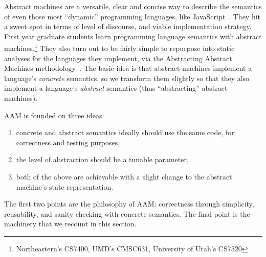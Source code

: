 Abstract machines are a versatile, clear and concise way to describe the semantics of even those most ``dynamic'' programming languages, like JavaScript~\citep{ianjohnson:DBLP:journals/corr/KashyapDKWGSWH14}.
%
They hit a sweet spot in terms of level of discourse, and viable implementation strategy.
%
First year graduate students learn programming language semantics with abstract machines.\footnote{Northeastern's CS7400, UMD's CMSC631, University of Utah's CS7520}
%
They also turn out to be fairly simple to repurpose into static analyses for the languages they implement, via the Abstracting Abstract Machines methodology~\citep{dvanhorn:VanHorn2010Abstracting}.
%
The basic idea is that abstract machines implement a language's \emph{concrete} semantics, so we transform them slightly so that they also implement a language's \emph{abstract} semantics (thus ``abstracting'' abstract machines).

AAM is founded on three ideas:
\begin{enumerate}
\item{concrete and abstract semantics ideally should use the same code, for correctness and testing purposes,}
\item{the level of abstraction should be a tunable parameter,}
\item{both of the above are achievable with a slight change to the abstract machine's state representation.}
\end{enumerate}

The first two points are the philosophy of AAM: correctness through simplicity, reusability, and sanity checking with concrete semantics.
%
The final point is the machinery that we recount in this section.

